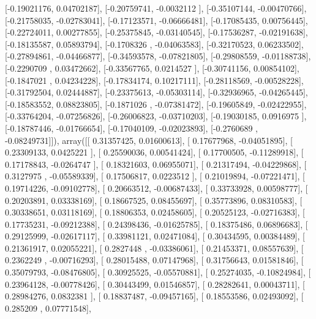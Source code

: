 \documentclass{article}
\begin{document}
       [-0.19021176,  0.04702187],
       [-0.20759741, -0.0032112 ],
       [-0.35107144, -0.00470766],
       [-0.21758035, -0.02783041],
       [-0.17123571, -0.06666481],
       [-0.17085435,  0.00756445],
       [-0.22724011,  0.00277855],
       [-0.25375845, -0.03140545],
       [-0.17536287, -0.02191638],
       [-0.18135587,  0.05893794],
       [-0.1708326 , -0.04063583],
       [-0.32170523,  0.06233502],
       [-0.27894861, -0.04466877],
       [-0.34593578, -0.07821805],
       [-0.29808559, -0.01188738],
       [-0.2290709 ,  0.03472662],
       [-0.33567765,  0.0214527 ],
       [-0.30741156,  0.00854102],
       [-0.1847021 ,  0.04234228],
       [-0.17834174,  0.10217111],
       [-0.28118569, -0.00528228],
       [-0.31792504,  0.02444887],
       [-0.23375613, -0.05303114],
       [-0.32936965, -0.04265445],
       [-0.18583552,  0.08823805],
       [-0.1871026 , -0.07381472],
       [-0.19605849, -0.02422955],
       [-0.33764204, -0.07256826],
       [-0.26006823, -0.03710203],
       [-0.19030185,  0.0916975 ],
       [-0.18787446, -0.01766654],
       [-0.17040109, -0.02023893],
       [-0.2760689 , -0.08249731]]), array([[ 0.31357425,  0.01600613],
       [ 0.17677968, -0.04051895],
       [ 0.23309133,  0.0425221 ],
       [ 0.25590036,  0.00541424],
       [ 0.17700505, -0.11289918],
       [ 0.17178843, -0.0264747 ],
       [ 0.18321603,  0.06955071],
       [ 0.21317494, -0.04229868],
       [ 0.3127975 , -0.05589339],
       [ 0.17506817,  0.0223512 ],
       [ 0.21019894, -0.07221471],
       [ 0.19714226, -0.09102778],
       [ 0.20663512, -0.00687433],
       [ 0.33733928,  0.00598777],
       [ 0.20203891,  0.03338169],
       [ 0.18667525,  0.08455697],
       [ 0.35773896,  0.08310583],
       [ 0.30338651,  0.03118169],
       [ 0.18806353,  0.02458605],
       [ 0.20525123, -0.02716383],
       [ 0.17735231, -0.09212388],
       [ 0.24398436, -0.01625785],
       [ 0.18375486,  0.06896683],
       [ 0.29125999, -0.02617117],
       [ 0.33981121,  0.02471084],
       [ 0.30434595,  0.00384489],
       [ 0.21361917,  0.02055221],
       [ 0.2827448 , -0.03386061],
       [ 0.21453371,  0.08557639],
       [ 0.2362249 , -0.00716293],
       [ 0.28015488,  0.07147968],
       [ 0.31756643,  0.01581846],
       [ 0.35079793, -0.08476805],
       [ 0.30925525, -0.05570881],
       [ 0.25274035, -0.10824984],
       [ 0.23964128, -0.00778426],
       [ 0.30443499,  0.01546857],
       [ 0.28282641,  0.00043711],
       [ 0.28984276,  0.0832381 ],
       [ 0.18837487, -0.09457165],
       [ 0.18553586,  0.02493092],
       [ 0.285209  ,  0.07771548],
\end{document}
